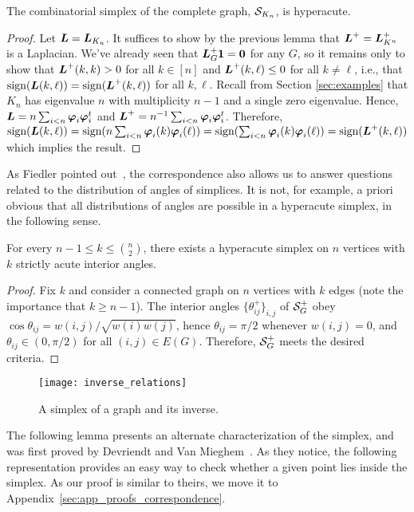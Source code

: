 \begin{corollary}
	The combinatorial simplex of the complete graph,  $\mathcal{S}_{K_n}$, is hyperacute. 
\end{corollary}
\begin{proof}
	Let $\vb*{L}=\vb*{L}_{K_n}$. 
	It suffices to show by the previous lemma that $\vb*{L}^+=\vb*{L}_{K^n}^+$ is a Laplacian. We've already seen that $\vb*{L}_G^+\vb{1}=\vb{0}$ for any $G$, so it remains only to show that $\vb*{L}^+(k,k)>0$ for all $k\in[n]$ and $\vb*{L}^+(k,\ell)\leq 0$ for all $k\neq\ell$, i.e., that $\textnormal{sign}(\vb*{L}(k,\ell))=\textnormal{sign}(\vb*{L}^+(k,\ell))$ for all $k,\ell$. Recall from Section \ref{sec:examples} that $K_n$ has eigenvalue $n$ with multiplicity $n-1$ and a single zero eigenvalue. Hence, $\vb*{L}=n\sum_{i<n}\vb*{\varphi}_i\vb*{\varphi}_i^t$ and $\vb*{L}^+=n^{-1}\sum_{i<n}\vb*{\varphi}_i\vb*{\varphi}_i^t$. 
	Therefore, $\textnormal{sign}(\vb*{L}(k,\ell)) = \textnormal{sign}(n\sum_{i<n}\vb*{\varphi}_i(k)\vb*{\varphi}_i(\ell)) = \textnormal{sign}(\sum_{i<n}\vb*{\varphi}_i(k)\vb*{\varphi}_i(\ell)) = \textnormal{sign}(\vb*{L}^+(k,\ell))$ which implies the result. 
\end{proof}


As Fiedler pointed out~\cite{fiedler1993geometric}, the correspondence also allows us to answer questions related to the distribution of angles of simplices. It is not, for example, a priori obvious that all distributions of angles  are possible in a hyperacute simplex, in the following sense. 

\begin{lemma}
	For every $n-1\leq k \leq \binom{n}{2}$, there exists a hyperacute simplex on $n$ vertices with $k$ strictly acute interior angles. 
\end{lemma}
\begin{proof}
	Fix $k$ and consider a connected graph on $n$ vertices with $k$ edges (note the importance that $k\geq n-1$). The interior angles $\{\theta_{ij}^+\}_{i,j}$ of $\mathcal{S}_G^+$ obey $\cos\theta_{ij} = w(i,j) / \sqrt{w(i)w(j)}$, hence $\theta_{ij}=\pi/2$ whenever $w(i,j)=0$, and $\theta_{ij}\in(0,\pi/2)$ for all $(i,j)\in E(G)$. Therefore, $\mathcal{S}_G^+$ meets the desired criteria. 
\end{proof}



\begin{figure}
	\centering
	\texttt{[image: inverse\_relations]}
	\caption{A simplex of a graph and its inverse. }
	\label{fig:inverse_relations}
\end{figure}


The following lemma presents an alternate characterization of the simplex, and was first proved by Devriendt  and Van Mieghem~\cite{devriendt2018simplex}. As they notice, the following representation provides an easy way to check whether a given point lies inside the simplex. As our proof is similar  to theirs, we move  it to  Appendix~\ref{sec:app_proofs_correspondence}. 

